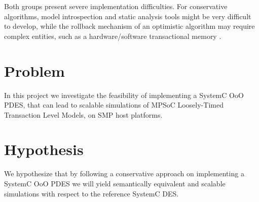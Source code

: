 \documentclass[12pt,twoside]{article}
\begin{document}
Both groups present severe implementation difficulties.
For conservative algorithms, model introspection and static analysis tools might be very difficult to develop,
while the rollback mechanism of an optimistic algorithm may require complex entities, such as a hardware/software transactional memory \cite{Anane2015} .


\section{Problem}
\label{sec:orgheadline10}
In this project we investigate the feasibility of implementing a SystemC OoO PDES, 
that can lead to scalable simulations of MPSoC Loosely-Timed Transaction Level Models,
on SMP host platforms.


\section{Hypothesis}
\label{sec:orgheadline11}
We hypothesize that by following a conservative approach on implementing a SystemC OoO PDES 
we will yield semantically equivalent and scalable simulations with respect to the reference SystemC DES.   
\end{document}

